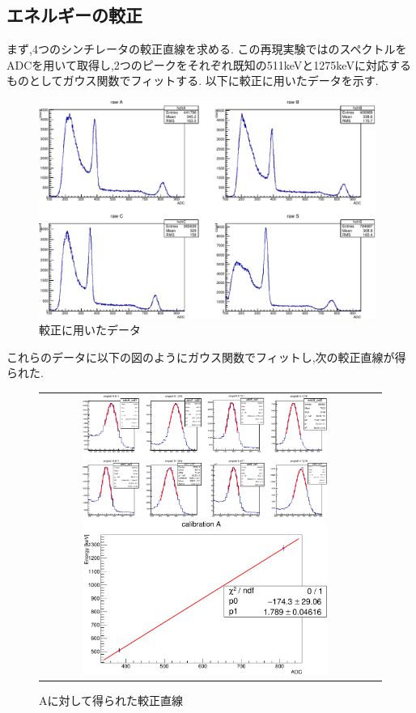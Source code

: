 \subsection{エネルギーの較正}
まず,4つのシンチレータの較正直線を求める.
この再現実験ではのスペクトルをADCを用いて取得し,2つのピークをそれぞれ既知の511keVと1275keVに対応するものとしてガウス関数でフィットする.
以下に較正に用いたデータを示す.
\begin{figure}[H]
	\centering
		\includegraphics[width=11cm]{fig/isb/cal7001.pdf}
		\caption{較正に用いたデータ}
		\label{fig:calibration_raw_data}
\end{figure}
これらのデータに以下の図のようにガウス関数でフィットし,次の較正直線が得られた.
\begin{figure}[htbp]
	\begin{tabular}{cc}
		\begin{minipage}{0.5\hsize}
			\centering
				\includegraphics[width=80mm]{fig/isb/gaussFit.pdf}
				\caption{ガウス関数によるフィッティング}
				\label{fig:cal_gauss}
		\end{minipage}
		\begin{minipage}{0.5\hsize}
			\centering
				\includegraphics[width=80mm]{fig/isb/fitA.pdf}
				\caption{Aに対して得られた較正直線}
				\label{fig:fitA}
		\end{minipage}
	\end{tabular}
\end{figure}
